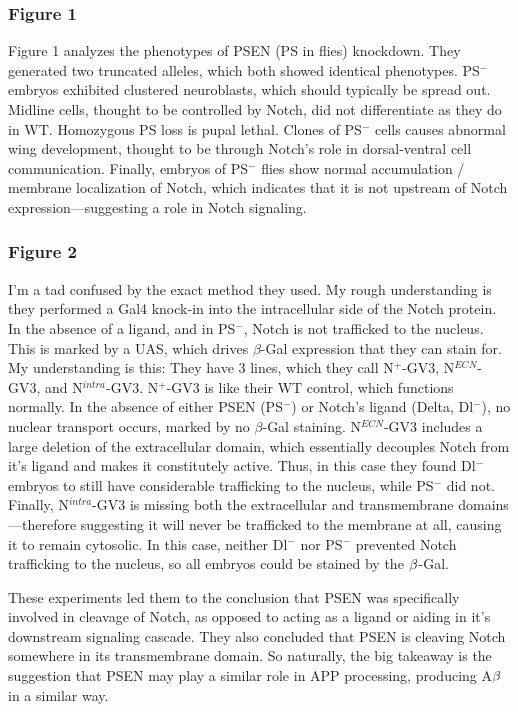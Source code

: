 \subsubsection*{Figure 1} Figure 1 analyzes the phenotypes of PSEN (PS in flies) knockdown. They generated two truncated alleles, which both showed identical phenotypes. PS$^-$ embryos exhibited clustered neuroblasts, which should typically be spread out. Midline cells, thought to be controlled by Notch, did not differentiate as they do in WT. Homozygous PS loss is pupal lethal. Clones of PS$^-$ cells causes abnormal wing development, thought to be through Notch's role in dorsal-ventral cell communication. Finally, embryos of PS$^-$ flies show normal accumulation / membrane localization of Notch, which indicates that it is not upstream of Notch expression---suggesting a role in Notch signaling. 

\subsubsection*{Figure 2} I'm a tad confused by the exact method they used. My rough understanding is they performed a Gal4 knock-in into the intracellular side of the Notch protein. In the absence of a ligand, and in PS$^-$, Notch is not trafficked to the nucleus. This is marked by a UAS, which drives $\beta$-Gal expression that they can stain for. My understanding is this: They have 3 lines, which they call N$^+$-GV3, N$^{ECN}$-GV3, and N$^{intra}$-GV3. N$^+$-GV3 is like their WT control, which functions normally. In the absence of either PSEN (PS$^-$) or Notch's ligand (Delta, Dl$^-$), no nuclear transport occurs, marked by no $\beta$-Gal staining. N$^{ECN}$-GV3 includes a large deletion of the extracellular domain, which essentially decouples Notch from it's ligand and makes it constitutely active. Thus, in this case they found Dl$^-$ embryos to still have considerable trafficking to the nucleus, while PS$^-$ did not. Finally, N$^{intra}$-GV3 is missing both the extracellular and transmembrane domains---therefore suggesting it will never be trafficked to the membrane at all, causing it to remain cytosolic. In this case, neither Dl$^-$ nor PS$^-$ prevented Notch trafficking to the nucleus, so all embryos could be stained by the $\beta$-Gal.\newline

These experiments led them to the conclusion that PSEN was specifically involved in cleavage of Notch, as opposed to acting as a ligand or aiding in it's downstream signaling cascade. They also concluded that PSEN is cleaving Notch somewhere in its transmembrane domain. So naturally, the big takeaway is the suggestion that PSEN may play a similar role in APP processing, producing A$\beta$ in a similar way. 

